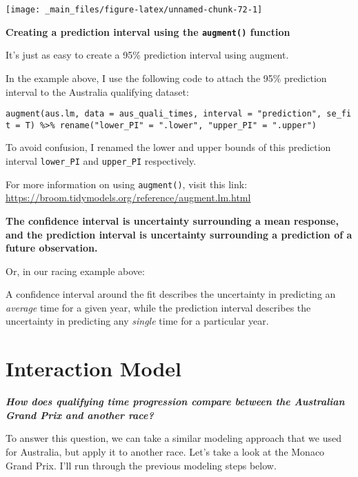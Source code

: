 \documentclass[
]{book}
\begin{document}
\begin{center}\texttt{[image: \_main\_files/figure-latex/unnamed-chunk-72-1]} \end{center}

\begin{blackbox}

\begin{center}
\textbf{Creating a prediction interval using the \texttt{augment()} function}

\end{center}

It's just as easy to create a 95\% prediction interval using augment.

In the example above, I use the following code to attach the 95\% prediction interval to the Australia qualifying dataset:

\texttt{augment(aus.lm,\ data\ =\ aus\_quali\_times,\ interval\ =\ "prediction",\ se\_fit\ =\ T)\ \%\textgreater{}\%\ rename("lower\_PI"\ =\ ".lower",\ "upper\_PI"\ =\ ".upper")}

To avoid confusion, I renamed the lower and upper bounds of this prediction interval \texttt{lower\_PI} and \texttt{upper\_PI} respectively.

For more information on using \texttt{augment()}, visit this link: \url{https://broom.tidymodels.org/reference/augment.lm.html}

\end{blackbox}

\textbf{The confidence interval is uncertainty surrounding a mean response, and the prediction interval is uncertainty surrounding a prediction of a future observation.}

Or, in our racing example above:

A confidence interval around the fit describes the uncertainty in predicting an \emph{average} time for a given year, while the prediction interval describes the uncertainty in predicting any \emph{single} time for a particular year.

\hypertarget{interaction-model}{%
\section{Interaction Model}\label{interaction-model}}

\textbf{\emph{How does qualifying time progression compare between the Australian Grand Prix and another race?}}

To answer this question, we can take a similar modeling approach that we used for Australia, but apply it to another race. Let's take a look at the Monaco Grand Prix. I'll run through the previous modeling steps below.
\end{document}
